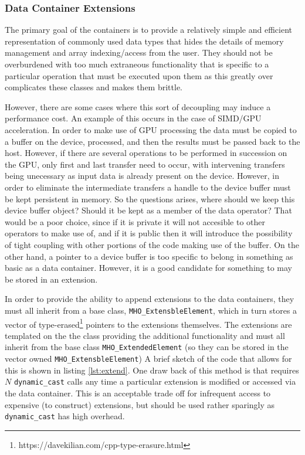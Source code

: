 \subsubsection{Data Container Extensions}

The primary goal of the containers is to provide a relatively simple and efficient representation of commonly used data types that hides the details of
memory management and array indexing/access from the user. They should not be overburdened with too much extraneous functionality that is specific to a particular operation that must be executed upon them as this greatly
over complicates these classes and makes them brittle. 

However, there are some cases where this sort of decoupling may induce a performance cost. An example of
this occurs in the case of SIMD/GPU acceleration. In order to make use of GPU processing the data must be copied to a buffer on the device, processed, and then the results must be passed back to the host. However, if there are several operations to be performed in succession on the GPU, only first and last transfer need to occur, with intervening transfers being unecessary as input data is already present on the device. However, in order to eliminate the intermediate transfers a handle to the device buffer must be kept persistent in memory. So the questions arises, where should we keep this device buffer object? Should it be kept as a member of the data operator? That would be a poor choice, since if it is private it will not accesible to other operators to make use of, and if it is public then it will introduce the possibility of tight coupling with other portions of the code making use of the buffer. On the other hand, a pointer to a device buffer is too specific to belong in something as basic as a data container. However, it is a good candidate for something to may be stored in an extension.

In order to provide the ability to append extensions to the data containers, they must all inherit from a base class, \texttt{MHO\_ExtensbleElement}, which
in turn stores a vector of type-erased\footnote{https://davekilian.com/cpp-type-erasure.html} pointers to the extensions themselves. The extensions are templated on the the class providing the additional functionality and must all inherit from the base class \texttt{MHO\_ExtendedElement} (so they can be stored in the vector owned \texttt{MHO\_ExtensbleElement}) A brief sketch of the code that allows for this is shown in listing \ref{lst:extend}. One draw back of this method is that requires $N$ \texttt{dynamic\_cast} calls any time a particular extension is modified or accessed via the data container. 
This is an acceptable trade off for infrequent access to expensive (to construct) extensions, but should be used rather sparingly as \texttt{dynamic\_cast} has high overhead.


